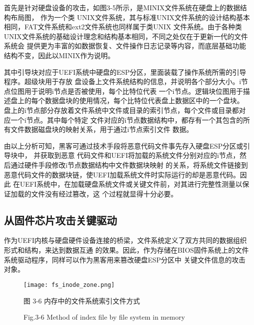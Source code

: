 \par 首先是针对硬盘设备的攻击，如图3-5所示，是MINIX文件系统在硬盘上的数据结构布局图\cite{chinese30}，
作为一个类
UNIX文件系统，其与标准UNIX文件系统的设计结构基本相同，FAT文件系统和ext2文件系统也同样属于类UNIX
文件系统。由于各种类UNIX文件系统的基础设计理念和结构基本相同，不同之处仅在于更新一代的文件系统会
提供更为丰富的如数据恢复、文件操作日志记录等内容，而底层基础功能结构不变，因此以MINIX作为说明\cite{chinese31}。
\par 其中引导块对应于UEFI系统中硬盘的ESP分区，里面装载了操作系统所需的引导程序。超级块用于存放
盘设备上文件系统结构的信息，并说明各个部分大小。i节点位图用于说明i节点是否被使用，每个比特位代表
一个i节点。逻辑块位图用于描述盘上的每个数据盘块的使用情况，每个比特位代表盘上数据区中的一个盘块。
盘上的i节点部分存放着文件系统中文件或目录的索引节点，每个文件或目录都对应一个i节点。其中每个特定
文件对应的i节点数据结构中，都存有一个其包含的所有文件数据磁盘块的映射关系，用于通过i节点索引文件
数据。
\par 由以上分析可知，黑客可通过技术手段将恶意代码文件事先存入硬盘ESP分区或引导块中\cite{chinese32}，
并获取到恶意
代码文件和UEFI将加载的系统文件分别对应的i节点，然后通过硬件手段修改i节点数据结构中文件数据块映射
的关系，将系统文件链接到恶意代码文件的数据块链，使UEFI加载系统文件时实际运行的却是恶意代码。因此
在UEFI系统中，在加载硬盘系统文件或关键文件前，对其进行完整性测量以保证加载的文件没有经过篡改，这
个过程就显得十分必要。

\subsection{从固件芯片攻击关键驱动}
作为UEFI内核与硬盘硬件设备连接的桥梁，文件系统定义了双方共同的数据组织形式和结构，来达到数据互通
的效果。因此，作为存储在BIOS固件系统上的文件系统驱动程序，同样可以作为黑客用来篡改硬盘ESP分区中
关键文件信息的攻击对象。

\begin{figure}[htb]
    \vspace{0cm}   
    \setlength{\abovecaptionskip}{0.3cm}  
	\centering
    \texttt{[image: fs\_inode\_zone.png]}
    \caption*{图 3-6 内存中的文件系统索引文件方式}
    \setlength{\belowcaptionskip}{-0.7cm}
    \caption*{Fig.3-6 Method of index file by file system in memory}
\end{figure}

